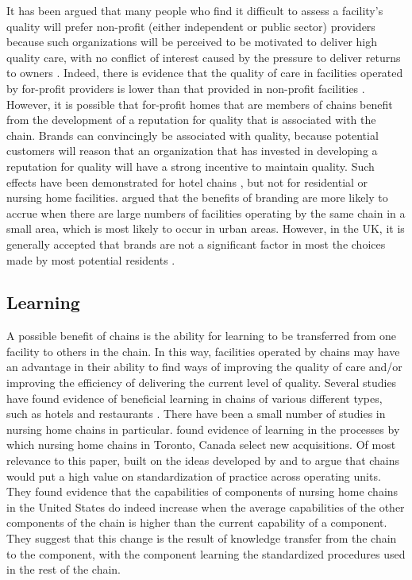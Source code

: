 \documentclass[a4paper,11pt,titlepage,british]{article}
\begin{document}
It has been argued that many people who find it difficult to assess a facility's quality will prefer non-profit (either independent or public sector) providers because such organizations will be perceived to be motivated to deliver high quality care, with no conflict of interest caused by the pressure to deliver returns to owners \parencites{Arrow1963}{Hirth1999}{Grabowski2003}.  Indeed, there is evidence that the quality of care in facilities operated by for-profit providers is lower than that provided in non-profit facilities \parencite{Barron2017}.  However, it is possible that for-profit homes that are members of chains benefit from the development of a reputation for quality that is associated with the chain.  Brands can convincingly be associated with quality, because potential customers will reason that an organization that has invested in developing a reputation for quality will have a strong incentive to maintain quality.  Such effects have been demonstrated for hotel chains \parencite{Ingram1999}, but not for residential or nursing home facilities.  \textcite{Baum1999} argued that the benefits of branding are more likely to accrue when there are large numbers of facilities operating by the same chain in a small area, which is most likely to occur in urban areas.  However, in the UK, it is generally accepted that brands are not a significant factor in most the choices made by most potential residents \parencite{LaingBuisson2015}.

\subsection{Learning}

A possible benefit of chains is the ability for learning to be transferred from one facility to others in the chain.  In this way, facilities operated by chains may have an advantage in their ability to find ways of improving the quality of care and/or improving the efficiency of delivering the current level of quality. Several studies have found evidence of beneficial learning in chains of various different types, such as hotels and restaurants \parencites{Baum1998}{Sorenson2001}.  There have been a small number of studies in nursing home chains in particular. \textcite{Baum2000} found evidence of learning in the processes by which nursing home chains in Toronto, Canada select new acquisitions.  Of most relevance to this paper, \textcite{Mitchell2002} built on the ideas developed by \textcite{Hannan1984} and \textcite{Baum1999} to argue that chains would put a high value on standardization of practice across operating units.  They found evidence that the capabilities of components of nursing home chains in the United States do indeed increase when the average capabilities of the other components of the chain is higher than the current capability of a component. They suggest that this change is the result of knowledge transfer from the chain to the component, with the component learning the standardized procedures used in the rest of the chain.
\end{document}
